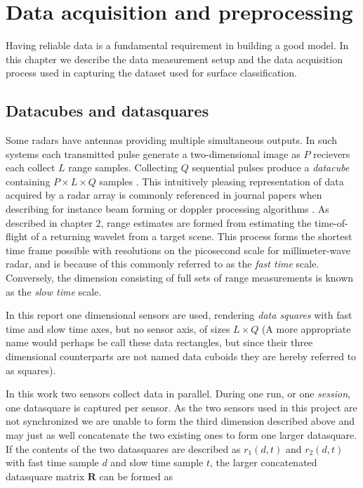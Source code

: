 \chapter{Data acquisition and preprocessing}

Having reliable data is a fundamental requirement in building a good model. In this chapter we describe the data measurement setup and the data acquisition process used in capturing the dataset used for surface classification. 

\section{Datacubes and datasquares}
Some radars have antennas providing multiple simultaneous outputs. In such systems each transmitted pulse generate a two-dimensional image as $P$ recievers each collect $L$ range  samples. Collecting $Q$ sequential pulses produce a \emph{datacube} containing $P\times L\times Q$ samples \citep{richards_2014}. This intuitively pleasing representation of data acquired by a radar array is commonly referenced in journal papers when describing for instance beam forming or doppler processing algorithms \citep{gentile_donovan_2018}. As described in chapter 2, range estimates are formed from estimating the time-of-flight of a returning wavelet from a target scene. This process forms the shortest time frame possible with resolutions on the picosecond scale for millimeter-wave radar, and is because of this commonly referred to as the \emph{fast time} scale. Conversely, the dimension consisting of full sets of range measurements is known as the \emph{slow time} scale.

In this report one dimensional sensors are used, rendering \emph{data squares} with fast time and slow time axes, but no sensor axis, of sizes $L\times Q$ (A more appropriate name would perhaps be call these data rectangles, but since their three dimensional counterparts are not named data cuboids they are hereby referred to as squares).  

In this work two sensors collect data in parallel. During one run, or one \emph{session}, one datasquare is captured per sensor. As the two sensors used in this project are not synchronized we are unable to form the third dimension described above and may just as well concatenate the two existing ones to form one larger datasquare. If the contents of the two datasquares are described as $r_1(d,t)$ and $r_2(d,t)$ with fast time sample $d$ and slow time sample $t$, the larger concatenated datasquare matrix $\mathbf{R}$ can be formed as

